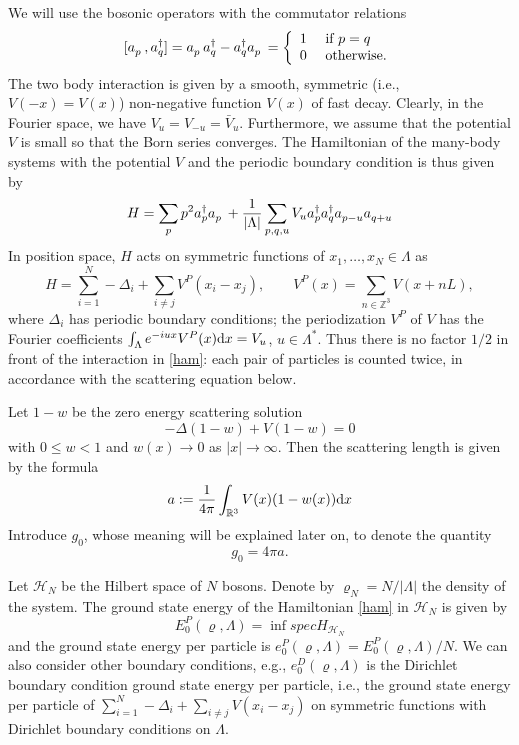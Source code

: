 \documentclass[11pt]{article}
\numberwithin{equation}{section}
\newcommand{\rd}{{\rm d}}
\newcommand{\ann}{a^{\hphantom{+}}}
\newcommand{\cre}{a^{\dagger}}
\newcommand{\beq}{\begin{equation}}
\newcommand{\eeq}{\end{equation}}
\newcommand\Z{{\mathbb Z}}
\newcommand\R{{\mathbb R}}
\renewcommand\rho\varrho
\theoremstyle{definition}
\begin{document}
We will use the bosonic operators with the commutator relations
$$
      [\ann_p, \cre_q] = \ann_p \cre_q -\cre_q\ann_p
     = \left\{
\begin{array}{ll}
  1 & \mbox{ if } p=q \\ 
0 & \mbox{ otherwise.}
\end{array} 
\right.
$$
The two body interaction is given by  a smooth, symmetric (i.e., $V(-x)=V(x)$)  non-negative function $V(x)$  of fast decay.
Clearly, in the Fourier space, we have 
$    V_u=V_{-u}= \bar V_u$. 
Furthermore,  we assume that the potential $V$ is small so that the Born series converges.
The  Hamiltonian of the many-body systems with the potential $V$ and the periodic boundary condition is thus  given by
\beq
      H = 
\sum_p p^2 \cre_p\ann_p + \frac{1}{|\Lambda|} \sum_{p,q,u}
     V_u \cre_p\cre_q\ann_{p-u}\ann_{q+u}
\label{ham}
\eeq
In position space, $H$ acts on symmetric functions of $x_1, \ldots, x_N\in \Lambda$ as
\[
H=\sum_{i=1}^N-\Delta_i+\sum_{i\neq j}V^P(x_i-x_j), \qquad V^P(x)=\sum_{n\in\Z^3}V(x+nL),
\]
where $\Delta_i$ has periodic boundary conditions; the periodization $V^P$ of $V$ has the Fourier coefficients
$\int_\Lambda e^{-iux}V^P(x)\rd x=V_u$, $u\in\Lambda^*$.
Thus there is no factor $1/2$ in front of the interaction in \eqref{ham}: each pair of particles is counted twice,
in accordance with the scattering equation below.

Let $1-w$ be the zero energy scattering solution 
$$
    -\Delta(1-w) +  V(1-w)=0
$$
with $0\leq w<1$ and $w(x)\to 0$ as $|x|\to \infty$.
Then the scattering length is given by the formula 
$$
   a: =\frac{1}{4\pi}\int_{\R^3} V(x)(1-w(x))\rd x
$$
Introduce $g_0$, whose meaning will be explained later on,  to denote the  quantity
\[
g_0 = 4 \pi a.
\]

Let $\mathcal H_N$ be the Hilbert space of  $N$ bosons. Denote by $\rho_N=N/|\Lambda|$ the density of the system.
The ground state energy of the Hamiltonian \eqref{ham} in  $\mathcal H_N$  
is given by 
\[
E^{P}_0(\rho,\Lambda) = \inf spec H_{\mathcal H_N}
\]
and the ground state energy per particle is $e_0^P(\rho,\Lambda) =  E_0^P(\rho,\Lambda)/N$. We can also consider other boundary 
conditions, e.g., $e_0^D(\rho,\Lambda)$ is the Dirichlet boundary condition ground state energy per particle,
i.e., the ground state energy per particle of $\sum_{i=1}^N-\Delta_i+\sum_{i\neq j}V(x_i-x_j)$ on symmetric functions
with Dirichlet boundary conditions on $\Lambda$.
\end{document}
